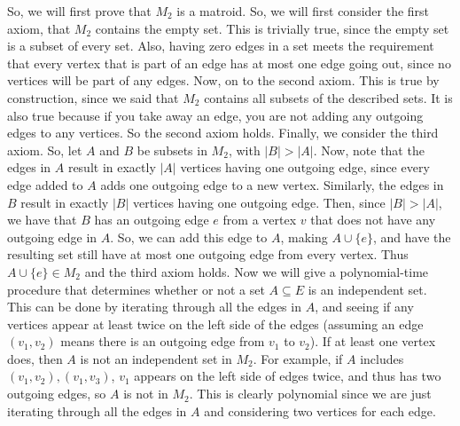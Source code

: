 \documentclass{article}
\begin{document}
So, we will first prove that $M_2$ is a matroid. So,
we will first consider the first axiom, that $M_2$ contains the empty set. This
is trivially true, since the empty set is a subset of every set. Also, having
zero edges in a set meets the requirement that every vertex that is part of an
edge has at most one edge going out, since no vertices will be part of any edges.
Now, on to the second axiom. This is true by construction, since we said that
$M_2$ contains all subsets of the described sets. It is also true because if you
take away an edge, you are not adding any outgoing edges to any vertices. So the
second axiom holds. Finally, we consider the third axiom. So, let $A$ and $B$ be
subsets in $M_2$, with $|B| > |A|$. Now, note that the edges in $A$ result in exactly $|A|$
vertices having one outgoing edge, since every edge added to $A$ adds one
outgoing edge to a new vertex. Similarly, the edges in $B$ result in exactly
$|B|$ vertices having one outgoing edge. Then, since $|B| > |A|$, we have that
$B$ has an outgoing edge $e$ from a vertex $v$ that does not have any outgoing edge
in $A$. So, we can add this edge to $A$, making $A \cup \{e\}$, and have the
resulting set still have at most one outgoing edge from every vertex. Thus $A
\cup \{e\} \in M_2$ and the third axiom holds. Now we will give a
polynomial-time procedure that determines whether or not a set $A \subseteq E$ is an
independent set. This can be done by iterating through all the edges in $A$, and
seeing if any vertices appear at least twice on the left side of the
edges (assuming an edge $(v_1,
v_2)$ means there is an outgoing edge from $v_1$ to $v_2$). If at least one
vertex does, then $A$ is not an independent set in $M_2$. For example, if $A$
includes $(v_1, v_2), (v_1, v_3)$, $v_1$ appears on the left side of edges
twice, and thus has two outgoing edges, so $A$ is not in $M_2$. This is clearly
polynomial since we are just iterating through all the edges in $A$ and
considering two vertices for each edge.
\end{document}
